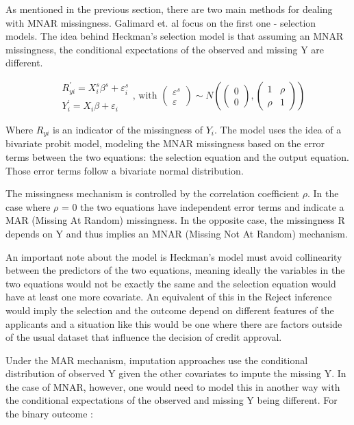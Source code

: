 \documentclass[11pt,a4paper]{article}
\begin{document}
As mentioned in the previous section, there are two main methods for dealing with MNAR missingness. Galimard et. al \cite{galimard_heckman_2018} focus on the first one - selection models. The idea behind Heckman’s selection model is that assuming an MNAR missingness, the conditional expectations of the observed and missing Y are different. 


$$
\begin{aligned}
& R_{y i}^{\prime}=X_i^s \beta^s+\varepsilon_i^s \\
& Y_i^{\prime}=X_i \beta+\varepsilon_i
\end{aligned}  \text {, with }\left(\begin{array}{l}
\varepsilon^s \\
\varepsilon
\end{array}\right) \sim N\left(\left(\begin{array}{l}
0 \\
0
\end{array}\right),\left(\begin{array}{ll}
1 & \rho \\
\rho & 1
\end{array}\right)\right)
$$


Where $R_{y i}$ is an indicator of the missingness of $Y_i$. The model uses the idea of a bivariate probit model, modeling the MNAR missingness based on the error terms between the two equations: the selection equation and the output equation. Those error terms follow a bivariate normal distribution. 

The missingness mechanism is controlled by the correlation coefficient $\rho$. In the case where $\rho$ = 0 the two equations have independent error terms and indicate a MAR (Missing At Random) missingness. In the opposite case, the missingness R depends on Y and thus implies an MNAR (Missing Not At Random) mechanism.

An important note about the model is Heckman’s model must avoid collinearity between the predictors of the two equations, meaning ideally the variables in the two equations would not be exactly the same and the selection equation would have at least one more covariate. An equivalent of this in the Reject inference would imply the selection and the outcome depend on different features of the applicants and a situation like this would be one where there are factors outside of the usual dataset that influence the decision of credit approval. 

Under the MAR mechanism, imputation approaches use the conditional distribution of observed Y given the other covariates to impute the missing Y. In the case of MNAR, however, one would need to model this in another way with the conditional expectations of the observed and missing Y being different. For the binary outcome \cite{Webel_2011}:
\end{document}
